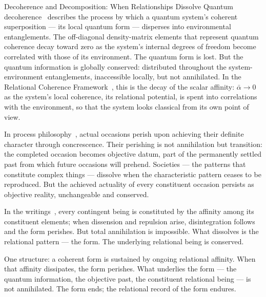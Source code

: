 \begin{convergencemoment}{Decoherence and Decomposition: When Relationships Dissolve}
Quantum decoherence~\citep{Zurek2003} describes the process by which a quantum system's coherent superposition --- its local quantum form --- disperses into environmental entanglements.
The off-diagonal density-matrix elements that represent quantum coherence decay toward zero as the system's internal degrees of freedom become correlated with those of its environment.
The quantum form is lost.
But the quantum information is globally conserved: distributed throughout the system-environment entanglements, inaccessible locally, but not annihilated.
In the Relational Coherence Framework~\citep{AdamsRCT}, this is the decay of the scalar affinity: $\bar{\alpha} \to 0$ as the system's local coherence, its relational potential, is spent into correlations with the environment, so that the system looks classical from its own point of view.

In process philosophy~\citep{Whitehead1929}, actual occasions perish upon achieving their definite character through concrescence.
Their perishing is not annihilation but transition: the completed occasion becomes objective datum, part of the permanently settled past from which future occasions will prehend.
Societies --- the patterns that constitute complex things --- dissolve when the characteristic pattern ceases to be reproduced.
But the achieved actuality of every constituent occasion persists as objective reality, unchangeable and conserved.

In the \bahai writings~\citep[Talks 38, 41]{PUP}, every contingent being is constituted by the affinity among its constituent elements; when dissension and repulsion arise, disintegration follows and the form perishes.
But total annihilation is impossible.
What dissolves is the relational pattern --- the form.
The underlying relational being is conserved.

One structure: a coherent form is sustained by ongoing relational affinity.
When that affinity dissipates, the form perishes.
What underlies the form --- the quantum information, the objective past, the constituent relational being --- is not annihilated.
The form ends; the relational record of the form endures.
\end{convergencemoment}
